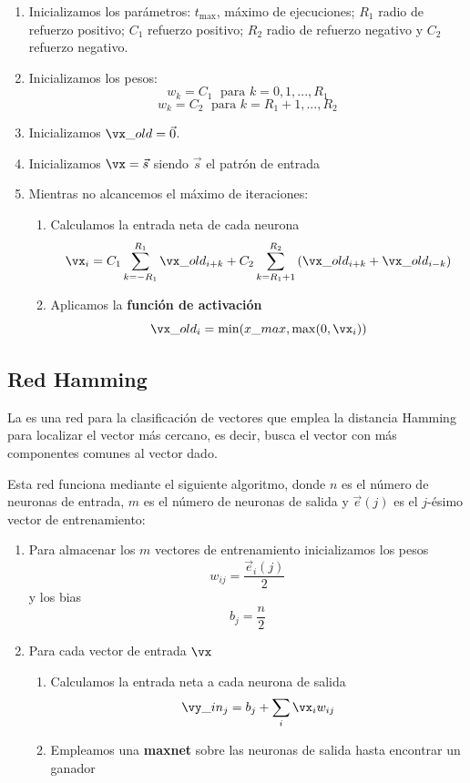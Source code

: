 \begin{enumerate}
\item Inicializamos los parámetros: $t_{\text{max}}$, máximo de ejecuciones; $R_1$ radio de refuerzo positivo; $C_1$ refuerzo positivo; $R_2$ radio de refuerzo negativo y $C_2$ refuerzo negativo.
\item Inicializamos los pesos:
\[w_k = C_1 \; \text{ para } k = 0,1,...,R_1\]
\[w_k = C_2 \; \text{ para } k = R_1+1,...,R_2\]
\item Inicializamos $\vx\_old=\vec{0}$.
\item Inicializamos $\vx=\vec{s}$ siendo $\vec{s}$ el patrón de entrada
\item Mientras no alcancemos el máximo de iteraciones:
\begin{enumerate}
\item Calculamos la entrada neta de cada neurona
\[\vx_i = C_1 \sum_{k=-R_1}^{R_1}\vx\_old_{i+k} + C_2 \sum_{k=R_1+1}^{R_2}\left(\vx\_old_{i+k}+\vx\_old_{i-k}\right)\]
\item Aplicamos la \textbf{función de activación}
\[\vx\_old_i = \min(x\_max, \max(0,\vx_i))\]
\end{enumerate}
\end{enumerate}

\subsection{Red Hamming}
La  es una red para la clasificación de vectores que emplea la distancia Hamming para localizar el vector más cercano, es decir, busca el vector con más componentes comunes al vector dado.

Esta red funciona mediante el siguiente algoritmo, donde $n$ es el número de neuronas de entrada, $m$ es el número de neuronas de salida y $\vec{e}(j)$ es el $j$-ésimo vector de entrenamiento:
\begin{enumerate}
\item Para almacenar los $m$ vectores de entrenamiento inicializamos los pesos
\[w_{ij} = \frac{\vec{e}_i(j)}{2}\]
y los bias
\[b_j = \frac{n}{2}\]
\item Para cada vector de entrada $\vx$
\begin{enumerate}
\item Calculamos la entrada neta a cada neurona de salida
\[\vy\_in_j = b_j + \sum_i \vx_iw_{ij}\]
\item Empleamos una \textbf{maxnet} sobre las neuronas de salida hasta encontrar un ganador
\end{enumerate}
\end{enumerate}

